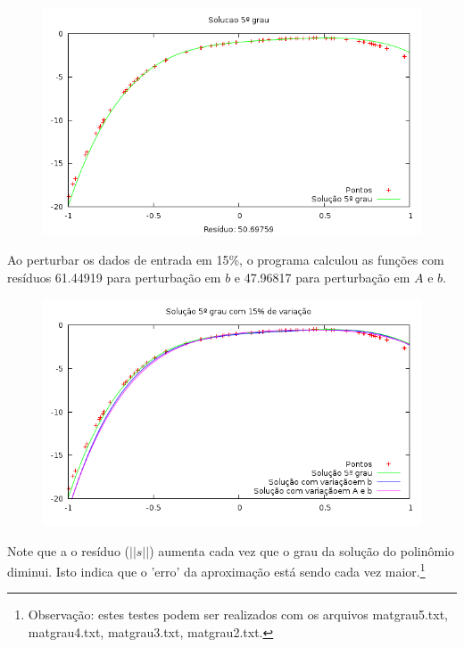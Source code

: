 \begin{figure}[h]
\centering
\includegraphics[scale=0.7]{sol5grau}
\end{figure}
Ao perturbar os dados de entrada em 15\%, o programa calculou as funções 
com resíduos 61.44919  para perturbação em $b$ e 47.96817 para perturbação em $A$ e $b$.
\begin{figure}[h]
\centering
\includegraphics[scale=0.7]{sol5grau_var}
\end{figure}

Note que a o resíduo ($||s||$) aumenta cada vez que o grau da solução do polinômio diminui. Isto indica que o 'erro’ da aproximação está sendo cada vez maior.\footnote{Observação: estes testes podem ser realizados com os arquivos matgrau5.txt, matgrau4.txt, matgrau3.txt, matgrau2.txt.}

